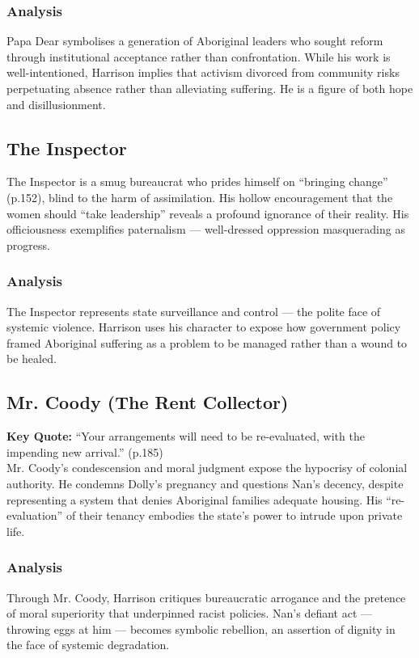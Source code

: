 \documentclass[a4paper]{article}
\begin{document}
\subsubsection{Analysis}
Papa Dear symbolises a generation of Aboriginal leaders who sought reform through institutional acceptance rather than confrontation. While his work is well-intentioned, Harrison implies that activism divorced from community risks perpetuating absence rather than alleviating suffering. He is a figure of both hope and disillusionment.\\

\subsection{The Inspector}
The Inspector is a smug bureaucrat who prides himself on “bringing change” (p.152), blind to the harm of assimilation. His hollow encouragement that the women should “take leadership” reveals a profound ignorance of their reality. His officiousness exemplifies paternalism — well-dressed oppression masquerading as progress.\\

\subsubsection{Analysis}
The Inspector represents state surveillance and control — the polite face of systemic violence. Harrison uses his character to expose how government policy framed Aboriginal suffering as a problem to be managed rather than a wound to be healed.\\

\subsection{Mr. Coody (The Rent Collector)}
\textbf{Key Quote:} ``Your arrangements will need to be re-evaluated, with the impending new arrival.'' (p.185)\\

Mr. Coody’s condescension and moral judgment expose the hypocrisy of colonial authority. He condemns Dolly’s pregnancy and questions Nan’s decency, despite representing a system that denies Aboriginal families adequate housing. His “re-evaluation” of their tenancy embodies the state’s power to intrude upon private life.\\

\subsubsection{Analysis}
Through Mr. Coody, Harrison critiques bureaucratic arrogance and the pretence of moral superiority that underpinned racist policies. Nan’s defiant act — throwing eggs at him — becomes symbolic rebellion, an assertion of dignity in the face of systemic degradation.\\
\end{document}
